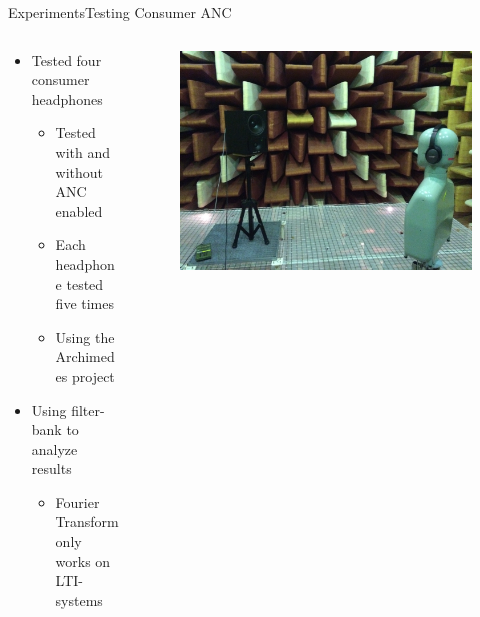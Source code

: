 \begin{frame}{Experiments}{Testing Consumer ANC}		
	\begin{columns}
		\begin{column}{0.5\textwidth}
			\begin{itemize}
				\item Tested four consumer headphones
					\begin{itemize}
						\item Tested with and without ANC enabled
						\item Each headphone tested five times
						\item Using the Archimedes project
					\end{itemize}
				\item Using filter-bank to analyze results
				\begin{itemize}
					\item Fourier Transform only works on LTI-systems
				\end{itemize}
			\end{itemize}
		\end{column}
		\begin{column}{0.5\textwidth} 				
			\begin{figure}[h]
				\includegraphics[width=1\textwidth]{figures/OtherBrandsSetupSide.jpg}
			\end{figure}
		\end{column}
	\end{columns}
\end{frame}
